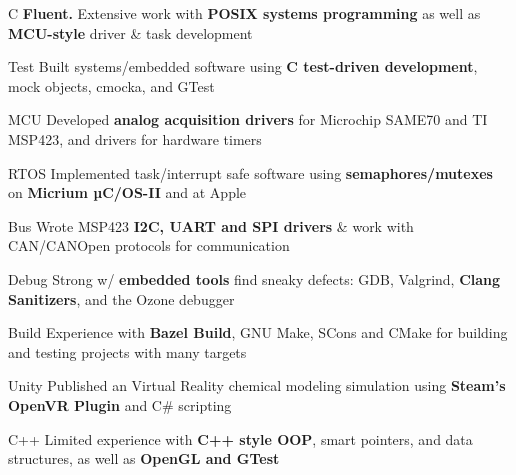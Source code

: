 \begin{cvskills}

 \cvskill
    {C} %
    {\textbf{Fluent.} Extensive work with \textbf{POSIX systems programming} as well as \textbf{MCU-style} driver \& task development}%

 \cvskill
    {Test} %
    {Built systems/embedded software using \textbf{C test-driven development}, mock objects, cmocka, and GTest} %

 \cvskill
    {MCU} %
    {Developed \textbf{analog acquisition drivers} for Microchip SAME70 and TI MSP423, and drivers for hardware timers} %

 \cvskill
    {RTOS} %
    {Implemented task/interrupt safe software using \textbf{semaphores/mutexes} on \textbf{Micrium µC/OS-II} and at Apple} %

 \cvskill
    {Bus} %
    {Wrote MSP423 \textbf{I2C, UART and SPI drivers} \& work with CAN/CANOpen protocols for communication}

 \cvskill
    {Debug} %
    {Strong w/ \textbf{embedded tools} find sneaky defects: GDB, Valgrind, \textbf{Clang Sanitizers}, and the Ozone debugger} %

 \cvskill
    {Build} %
    {Experience with \textbf{Bazel Build}, GNU Make, SCons and CMake for building and testing projects with many targets} %


 \cvskill
    {Unity} %
    {Published an Virtual Reality chemical modeling simulation using \textbf{Steam's OpenVR Plugin} and C\# scripting}


 \cvskill
    {C++} %
    {Limited experience with \textbf{C++ style OOP}, smart pointers, and data structures, as well as \textbf{OpenGL and GTest}}%
    




\end{cvskills}
